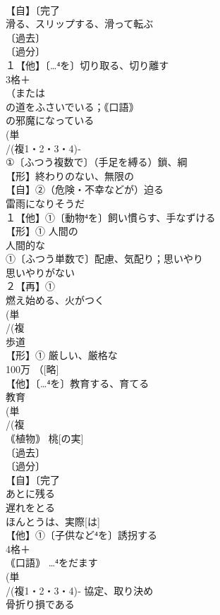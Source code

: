 \documentclass[8pt]{extreport}
\begin{document}
\begin{CJK}{UTF8}{min}
\\	【自】〔完了
\\	滑る、スリップする、滑って転ぶ 
\\	〔過去〕
\\	〔過分〕
\\	１【他】〔…⁴を〕切り取る、切り離す 
\\	3格＋
\\	（または
\\	の道をふさいでいる；｟口語｠ 
\\	の邪魔になっている
\\	(単
\\	/(複1・2・3・4)‐
\\	①〔ふつう複数で〕（手足を縛る）鎖、綱
\\	【形】終わりのない、無限の 
\\	【自】②（危険・不幸などが）迫る 
\\	雷雨になりそうだ
\\	１【他】①〔動物⁴を〕飼い慣らす、手なずける 
\\	【形】① 人間の 
\\	人間的な
\\	①〔ふつう単数で〕配慮、気配り；思いやり 
\\	思いやりがない
\\	２【再】①
\\	燃え始める、火がつく
\\	(単
\\	/(複
\\	歩道 
\\	【形】① 厳しい、厳格な 
\\	100万 （[略]
\\	【他】〔…⁴を〕教育する、育てる 
\\	教育
\\	(単
\\	/(複
\\	｟植物｠ 桃[の実] 
\\	〔過去〕
\\	〔過分〕
\\	【自】〔完了
\\	あとに残る　
\\	遅れをとる
\\	ほんとうは、実際[は]
\\	【他】①〔子供など⁴を〕誘拐する 
\\	4格＋
\\	｟口語｠ …⁴をだます
\\	(単
\\	/(複1・2・3・4)‐ 協定、取り決め 
\\	骨折り損である

\end{CJK}
\end{document}
